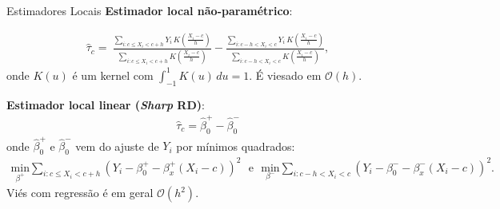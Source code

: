 \documentclass[aspectratio=1610, 10pt]{beamer}
\begin{document}
\begin{frame}{Estimadores Locais}
\textbf{Estimador local não-paramétrico}:

\begin{align*}
   \hat{\tau}_c = \ \frac{\sum_{i:c \leq X_i < c+h} Y_i \, K\left(\frac{X_i-c}{h}\right)}{\sum_{i:c \leq X_i < c+h} K\left(\frac{X_i-c}{h} \right)} - \frac{\sum_{i:c-h < X_i < c} Y_i \, K\left(\frac{X_i-c}{h}\right)}{{\sum_{i:c-h < X_i < c} K\left(\frac{X_i-c}{h}\right)}},
\end{align*}
onde $K(u)$ é um kernel com $\int_{-1}^{1} K(u) \, du = 1$. É viesado em $\mathcal{O}(h)$.

\vspace{0.3cm}
\textbf{Estimador local linear (\emph{Sharp} RD)}:
\begin{align*}
\hat{\tau}_c = \hat{\beta}_0^+ - \hat{\beta}_0^-
\end{align*}
onde $\hat{\beta}_0^+$ e $\hat{\beta}_0^-$ vem do ajuste de $Y_i$ por mínimos quadrados:
\begin{align*}
   \textstyle  \underset{\beta^+}{\mathrm{min}} \sum_{i:c \leq X_i < c+h}(Y_i - \beta_0^+ - \beta_x^+(X_i - c))^2  \ \ \ \text{e} \ \ \
    \underset{\beta^-}{\mathrm{min}} \sum_{i:c-h < X_i < c}(Y_i - \beta_0^- - \beta_x^-(X_i - c))^2.
\end{align*}
Viés com regressão é em geral $\mathcal{O}(h^2)$.
\end{frame}
\end{document}

